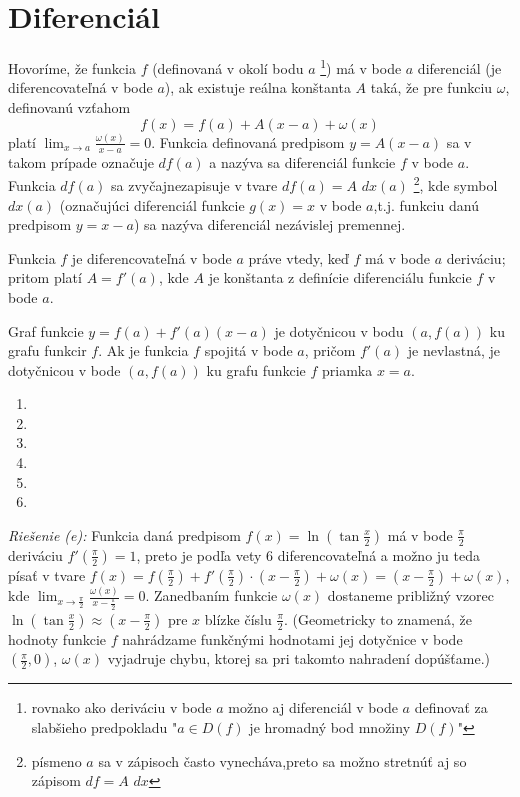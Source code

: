 \section{Diferenciál}
Hovoríme, že funkcia $f$ (definovaná v okolí bodu $a$ \footnote{rovnako ako deriváciu v bode $a$ možno aj diferenciál v bode $a$ definovať za slabšieho predpokladu "$a\in D(f)$ je hromadný bod množiny $D(f)$"}) má v bode $a$ diferenciál (je diferencovateľná v bode $a$), ak existuje reálna konštanta $A$ taká, že pre funkciu $\omega$, definovanú vzťahom
$$f(x)=f(a)+A(x-a)+\omega(x)$$ platí $\lim_{x \rightarrow a}\frac{\omega(x)}{x-a}=0$.
Funkcia definovaná predpisom $y=A(x-a)$ sa v takom prípade označuje $df(a)$ a nazýva sa diferenciál funkcie $f$ v bode $a$. Funkcia $df(a)$ sa zvyčajnezapisuje v tvare $df(a)=A$ $dx(a)$ \footnote{písmeno $a$ sa v zápisoch často vynecháva,preto sa možno stretnúť aj so zápisom $df=A$ $dx$}, kde symbol $dx(a)$ (označujúci diferenciál funkcie $g(x)=x$ v bode $a$,t.j. funkciu danú predpisom $y=x-a$) sa nazýva diferenciál nezávislej premennej.
\begin{veta}
Funkcia $f$ je diferencovateľná v bode $a$ práve vtedy, keď $f$ má v bode $a$ deriváciu; pritom platí $A=f'(a)$, kde $A$ je konštanta z definície diferenciálu funkcie $f$ v bode $a$.
\end{veta}

Graf funkcie $y=f(a)+f'(a)(x-a)$ je dotyčnicou v bodu $(a,f(a))$ ku grafu funkcir $f$. Ak je funkcia $f$ spojitá v bode $a$, pričom $f'(a)$ je nevlastná, je dotyčnicou v bode $(a,f(a))$ ku grafu funkcie $f$ priamka $x=a$.

\begin{enumerate}[resume]
	\item {}
	\item {}
	\item {}  
	\item {}
	\item {}
	\item {}
\end{enumerate}

\textit{Riešenie (e):}
Funkcia daná predpisom $f(x)=\ln (\tan \frac{x}{2})$ má v bode $\frac{\pi}{2}$ deriváciu $f'(\frac{\pi}{2})=1$, preto je podľa vety $6$ diferencovateľná a možno ju teda písať v tvare $f(x)=f(\frac{\pi}{2})+f'(\frac{\pi}{2})\cdot (x-\frac{\pi}{2})+\omega(x)=(x-\frac{\pi}{2})+\omega(x)$, kde $\lim_{x \rightarrow \frac{\pi}{2}}\frac{\omega(x)}{x-\frac{\pi}{2}}=0$. Zanedbaním funkcie $\omega(x)$ dostaneme približný vzorec $\ln (\tan \frac{x}{2})\approx (x-\frac{\pi}{2})$ pre $x$ blízke číslu $\frac{\pi}{2}$. (Geometricky to znamená, že hodnoty funkcie $f$ nahrádzame funkčnými hodnotami jej dotyčnice v bode $(\frac{\pi}{2},0)$, $\omega(x)$ vyjadruje chybu, ktorej sa pri takomto nahradení dopúšťame.)

